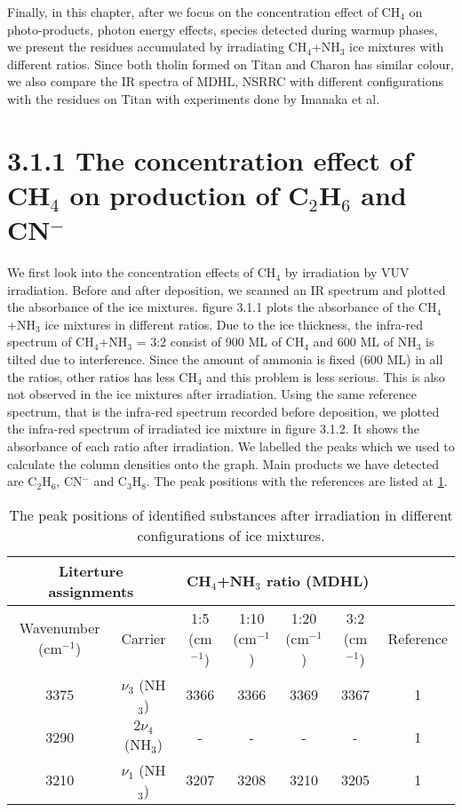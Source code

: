 Finally, in this chapter, after we focus on the concentration effect of CH$_4$ on photo-products, photon energy effects, species detected during warmup phases, we present the residues accumulated by irradiating CH$_4$+NH$_3$ ice mixtures with different ratios. Since both tholin formed on Titan and Charon has similar colour, we also compare the IR spectra of MDHL, NSRRC with different configurations with the residues on Titan with experiments done by Imanaka et al.\\
\section{3.1.1 The concentration effect of CH$_4$ on production of C$_2$H$_6$ and CN$^-$}
We first look into the concentration effects of CH$_4$ by irradiation by VUV irradiation. Before and after deposition, we scanned an IR spectrum and plotted the absorbance of the ice mixtures. figure 3.1.1 plots the absorbance of the CH$_4$+NH$_3$ ice mixtures in different ratios. Due to the ice thickness, the infra-red spectrum of CH$_4$+NH$_3$ = 3:2 consist of 900 ML of CH$_4$ and 600 ML of NH$_3$ is tilted due to interference. Since the amount of ammonia is fixed (600 ML) in all the ratios, other ratios has less CH$_4$ and this problem is less serious. This is also not observed in the ice mixtures after irradiation. Using the same reference spectrum, that is the infra-red spectrum recorded before deposition, we plotted the infra-red spectrum of irradiated ice mixture in figure 3.1.2. It shows the absorbance of each ratio after irradiation. We labelled the peaks which we used to calculate the column densities onto the graph. Main products we have detected are C$_2$H$_6$, CN$^-$ and C$_3$H$_8$. The peak positions with the references are listed at \ref{tab:WavenumberMDHL}.\\

\begin{table}[htbp]
\caption{The peak positions of identified substances after irradiation in different configurations of ice mixtures.}
\begin{tabular}{|c|c|c|c|c|c|c|}
\hline
\multicolumn{2}{|c|}{Literture assignments} & \multicolumn{4}{|c|}{CH$_4$+NH$_3$ ratio (MDHL)} &  \\
\hline
Wavenumber (cm$^{-1}$) & Carrier  & 1:5 (cm$^{-1}$) & 1:10 (cm$^{-1}$) & 1:20 (cm$^{-1}$) & 3:2 (cm$^{-1}$) & Reference \\
\hline
3375 & $\nu_3$ (NH$_3$) & 3366 & 3366 & 3369 & 3367 & 1 \\
\hline
3290 & $2\nu_4$ (NH$_3$) & - & - & - & - & 1 \\
\hline
3210 & $\nu_1$ (NH$_3$) & 3207 & 3208 & 3210 & 3205 & 1 \\
\hline
\end{tabular}
\label{tab:WavenumberMDHL}
\end{table}

